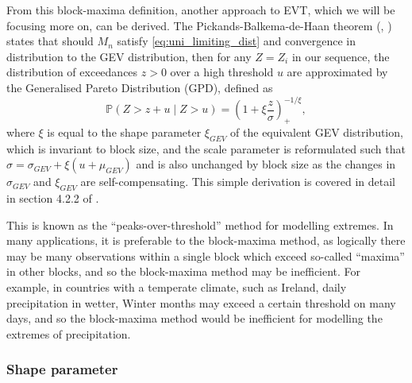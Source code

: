 \documentclass{article}
\numberwithin{equation}{section}
\begin{document}
From this block-maxima definition, another approach to EVT, which we will be focusing more on, can be derived.
The Pickands-Balkema-de-Haan theorem (\cite{Pickands1975}, \cite{Balkema1974}) states that should $M_n$ satisfy \ref{eq:uni_limiting_dist} and convergence in distribution to the GEV distribution, then for any $Z = Z_i$ in our sequence, the distribution of exceedances $z > 0$ over a high threshold $u$ are approximated by the Generalised Pareto Distribution (GPD), defined as
\begin{equation} \label{eq:gpd}
  \mathbb{P}(Z > z + u \mid Z > u) = \left(1 + \xi \frac{z}{\sigma} \right)_{+}^{-1/\xi},
\end{equation}
where $\xi$ is equal to the shape parameter $\xi_{GEV}$ of the equivalent GEV distribution, which is invariant to block size, and the scale parameter is reformulated such that $\sigma = \sigma_{GEV} + \xi(u + \mu_{GEV})$ and is also unchanged by block size as the changes in $\sigma_{GEV}$ and $\xi_{GEV}$ are self-compensating. %
This simple derivation is covered in detail in section 4.2.2 of \cite{Coles2001}. 

This is known as the ``peaks-over-threshold'' method for modelling extremes. 
In many applications, it is preferable to the block-maxima method, as logically there may be many observations within a single block which exceed so-called ``maxima'' in other blocks, and so the block-maxima method may be inefficient.
For example, in countries with a temperate climate, such as Ireland, daily precipitation in wetter, Winter months may exceed a certain threshold on many days, and so the block-maxima method would be inefficient for modelling the extremes of precipitation.

\subsubsection{Shape parameter}
\end{document}
